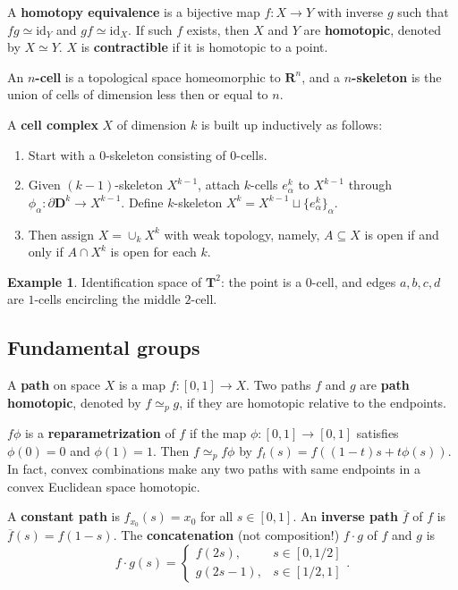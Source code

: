 \documentclass[11pt]{article}
\theoremstyle{definition}
\newtheorem*{example}{Example}
\theoremstyle{plain}
\theoremstyle{remark}
\newcommand{\id}{\textrm{id}}
\newcommand{\R}{\mathbf{R}}
\newcommand{\D}{\mathbf{D}}
\begin{document}
A \textbf{homotopy equivalence} is a bijective map $f:X\to Y$ with inverse $g$ such that $fg\simeq\id_Y$ and $gf\simeq\id_X$. If such $f$ exists, then $X$ and $Y$ are \textbf{homotopic}, denoted by $X\simeq Y$. $X$ is \textbf{contractible} if it is homotopic to a point.\medbreak

An \textbf{$n$-cell} is a topological space homeomorphic to $\R^n$, and a \textbf{$n$-skeleton} is the union of cells of dimension less then or equal to $n$.\medbreak

A \textbf{cell complex} $X$ of dimension $k$ is built up inductively as follows:\begin{enumerate}
    \item Start with a $0$-skeleton consisting of $0$-cells.
    \item Given $(k-1)$-skeleton $X^{k-1}$, attach $k$-cells $e^k_\alpha$ to $X^{k-1}$ through $\phi_\alpha:\partial\D^k\to X^{k-1}$. Define $k$-skeleton $X^k=X^{k-1}\sqcup\{e^k_\alpha\}_\alpha$.
    \item Then assign $X=\cup_kX^k$ with weak topology, namely, $A\subseteq X$ is open if and only if $A\cap X^k$ is open for each $k$.
\end{enumerate}
\begin{example}
Identification space of $\mathbf{T}^2$: the point is a $0$-cell, and edges $a,b,c,d$ are $1$-cells encircling the middle $2$-cell.
\end{example} 

\subsection{Fundamental groups}\label{3}

A \textbf{path} on space $X$ is a map $f:[0,1]\to X$. Two paths $f$ and $g$ are \textbf{path homotopic}, denoted by $f\simeq_pg$, if they are homotopic relative to the endpoints.\medbreak

$f\phi$ is a \textbf{reparametrization} of $f$ if the map $\phi:[0,1]\to[0,1]$ satisfies $\phi(0)=0$ and $\phi(1)=1$. Then $f\simeq_p f\phi$ by $f_t(s)=f((1-t)s+t\phi(s))$. In fact, convex combinations make any two paths with same endpoints in a convex Euclidean space homotopic.\medbreak

A \textbf{constant path} is $f_{x_0}(s)=x_0$ for all $s\in[0,1]$. An \textbf{inverse path} $\overline{f}$ of $f$ is $\overline{f}(s)=f(1-s)$. The \textbf{concatenation} (not composition!) $f\cdot g$ of $f$ and $g$ is
\[f\cdot g(s)=\begin{cases}
f(2s),&s\in[0,1/2]\\g(2s-1),&s\in[1/2,1]
\end{cases}.\]\medbreak
\end{document}
